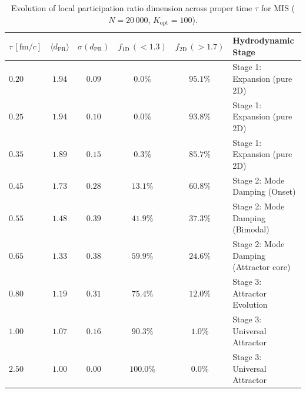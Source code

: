 \documentclass[11pt,a4paper]{article}
\begin{document}
\begin{table}[htbp]
    \centering
    \caption{Evolution of local participation ratio dimension across proper time $\tau$ for MIS ($N = 20\,000$, $K_{\mathrm{opt}} = 100$).}
    \label{tab:mis_stages_table}
    \vspace{0.4em}
    \begin{tabular}{@{}l c c c c l@{}}
        \toprule
        $\tau\,[\mathrm{fm}/c]$ & $\langle d_{\mathrm{PR}} \rangle$ & $\sigma(d_{\mathrm{PR}})$ & $f_{1\mathrm{D}}\,(<1.3)$ & $f_{2\mathrm{D}}\,(>1.7)$ & \textbf{Hydrodynamic Stage} \\
        \midrule
        $0.20$ & $1.94$ & $0.09$ & $0.0\%$ & $95.1\%$ & Stage 1: Expansion (pure 2D) \\
        $0.25$ & $1.94$ & $0.10$ & $0.0\%$ & $93.8\%$ & Stage 1: Expansion (pure 2D) \\
        $0.35$ & $1.89$ & $0.15$ & $0.3\%$ & $85.7\%$ & Stage 1: Expansion (pure 2D) \\
        \midrule
        $0.45$ & $1.73$ & $0.28$ & $13.1\%$ & $60.8\%$ & Stage 2: Mode Damping (Onset) \\
        $0.55$ & $1.48$ & $0.39$ & $41.9\%$ & $37.3\%$ & Stage 2: Mode Damping (Bimodal) \\
        $0.65$ & $1.33$ & $0.38$ & $59.9\%$ & $24.6\%$ & Stage 2: Mode Damping (Attractor core) \\
        \midrule
        $0.80$ & $1.19$ & $0.31$ & $75.4\%$ & $12.0\%$ & Stage 3: Attractor Evolution \\
        $1.00$ & $1.07$ & $0.16$ & $90.3\%$ & $1.0\%$ & Stage 3: Universal Attractor \\
        $2.50$ & $1.00$ & $0.00$ & $100.0\%$ & $0.0\%$ & Stage 3: Universal Attractor \\
        \bottomrule
    \end{tabular}
\end{table}
\end{document}
